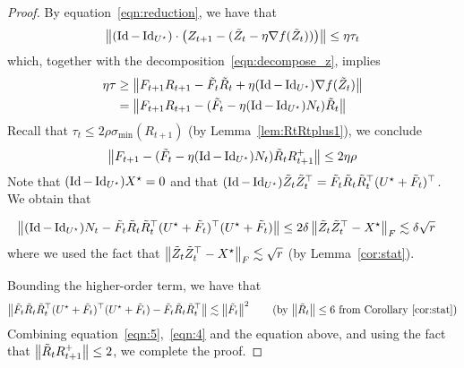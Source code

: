 \begin{proof}
By equation~\eqref{eqn:reduction}, we have that 
\begin{align*}
\left\|(\operatorname{Id} - \operatorname{Id}_{{{U}^\star}})\cdot \left(Z_{t+1} - (\tilde{Z}_t - \eta \nabla f(\tilde{Z}_t))\right)\right\| 	\le \eta \tau_t
\end{align*}
which, together with the decomposition~\eqref{eqn:decompose_z}, implies  
\begin{align*}
\eta \tau &\ge 	\left\|{F}_{t + 1}{R}_{t + 1} -  \tilde{F}_t \tilde{R}_t + \eta (\operatorname{Id} - \operatorname{Id}_{{{U}^\star}}) \nabla f(\tilde{Z}_t) \right\| \\
&= 	\left\|{F}_{t + 1}{R}_{t + 1} -  (\tilde{F}_t -\eta (\operatorname{Id} - \operatorname{Id}_{{{U}^\star}}) N_t)\tilde{R}_t \right\| 
\end{align*}
Recall that $\tau_t \le 2\rho\sigma_{\min}(R_{t+1})$ (by Lemma~\ref{lem:RtRtplus1}), we conclude
\begin{align}
\left\|{F}_{t + 1}-  (\tilde{F}_t -\eta(\operatorname{Id} - \operatorname{Id}_{{{U}^\star}})  N_t)\tilde{R}_t R_{t+1}^{+}\right\|  \le 2\eta\rho  \label{eqn:5}
\end{align}
Note that $(\operatorname{Id} -\operatorname{Id}_{{{U}^\star}})X^\star = 0$ and that $(\operatorname{Id} -\operatorname{Id}_{{{U}^\star}})\tilde{Z}_t\tilde{Z}_t^\top = \tilde{F}_t\tilde{R}_t\tilde{R}_t^\top({{U}^\star}+\tilde{F}_t)^\top$. We obtain that 

\begin{align}
\left\|(\operatorname{Id} -\operatorname{Id}_{{{U}^\star}})N_t-  \tilde{F}_t\tilde{R}_t\tilde{R}_t^\top({{U}^\star}+\tilde{F}_t)^\top({{U}^\star} + \tilde{F}_t)\right\| & \le 2\delta \left\|\tilde{Z}_t\tilde{Z}_t^\top - X^\star\right\|_F \lesssim \delta \sqrt{r} \label{eqn:4}
\end{align}
where we used the fact that $\left\|\tilde{Z}_t\tilde{Z}_t^\top - X^\star\right\|_F  \lesssim \sqrt{r}$ (by Lemma~\ref{cor:stat}). 

Bounding the higher-order term, we have that
\begin{align*}
\Norm{\tilde{F}_t\tilde{R}_t\tilde{R}_t^\top(\bUg+\tilde{F}_t)^\top (\bUg + \tilde{F}_t)- \tilde{F}_t\tilde{R}_t\tilde{R}_t^\top}\lesssim \Norm{\tilde{F}_t}^2 \tag{by $\Norm{\tilde{R}_t}\le 6$ from Corollary~\ref{cor:stat}}
\end{align*}
Combining equation~\eqref{eqn:5},~\eqref{eqn:4} and the equation above, and using the fact that $\left\|\tilde{R}_tR_{t+1}^+\right\|\le 2$, we complete the proof.\end{proof}






